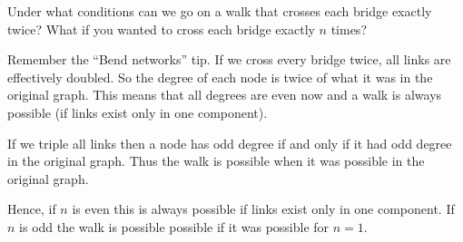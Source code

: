 
Under what conditions can we go on a walk that crosses each bridge exactly twice? What if you wanted to cross each bridge exactly $n$ times? 

\solution
Remember the ``Bend networks'' tip. If we cross every bridge twice, all links are effectively doubled. So the degree of each node is twice of what it was in the original graph. This means that all degrees are even now and a walk is always possible (if links exist only in one component).

If we triple all links then a node has odd degree if and only if it had odd degree in the original graph. Thus the walk is possible when it was possible in the original graph. 

Hence, if $n$ is even this is always possible if links exist only in one component. If $n$ is odd the walk is possible possible if it was possible for $n=1$. 
